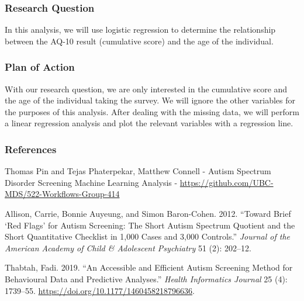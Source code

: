 \documentclass[
]{article}
\newlength{\cslhangindent}
\newenvironment{cslreferences}%
  {\setlength{\parindent}{0pt}%
  \everypar{\setlength{\hangindent}{\cslhangindent}}\ignorespaces}%
  {\par}
\begin{document}
\hypertarget{research-question}{%
\subsubsection{Research Question}\label{research-question}}

In this analysis, we will use logistic regression to determine the
relationship between the AQ-10 result (cumulative score) and the age of
the individual.

\hypertarget{plan-of-action}{%
\subsubsection{Plan of Action}\label{plan-of-action}}

With our research question, we are only interested in the cumulative
score and the age of the individual taking the survey. We will ignore
the other variables for the purposes of this analysis. After dealing
with the missing data, we will perform a linear regression analysis and
plot the relevant variables with a regression line.

\hypertarget{references}{%
\subsubsection{References}\label{references}}

Thomas Pin and Tejas Phaterpekar, Matthew Connell - Autism Spectrum
Disorder Screening Machine Learning Analysis -
\url{https://github.com/UBC-MDS/522-Workflows-Group-414}

\hypertarget{refs}{}
\begin{cslreferences}
\leavevmode\hypertarget{ref-allison2012toward}{}%
Allison, Carrie, Bonnie Auyeung, and Simon Baron-Cohen. 2012. ``Toward
Brief `Red Flags' for Autism Screening: The Short Autism Spectrum
Quotient and the Short Quantitative Checklist in 1,000 Cases and 3,000
Controls.'' \emph{Journal of the American Academy of Child \& Adolescent
Psychiatry} 51 (2): 202--12.

\leavevmode\hypertarget{ref-Fadi}{}%
Thabtah, Fadi. 2019. ``An Accessible and Efficient Autism Screening
Method for Behavioural Data and Predictive Analyses.'' \emph{Health
Informatics Journal} 25 (4): 1739--55.
\url{https://doi.org/10.1177/1460458218796636}.
\end{cslreferences}
\end{document}
